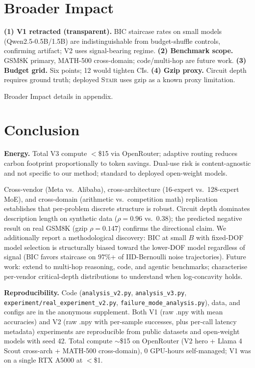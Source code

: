 \documentclass{article}
\newcommand{\method}{\textsc{Stair}}
\begin{document}
\section{Broader Impact}

\textbf{(1) V1 retracted (transparent).}  BIC staircase rates on small models (Qwen2.5-0.5B/1.5B) are indistinguishable from budget-shuffle controls, confirming artifact; V2 uses signal-bearing regime.  \textbf{(2) Benchmark scope.}  GSM8K primary, MATH-500 cross-domain; code/multi-hop are future work.  \textbf{(3) Budget grid.}  Six points; 12 would tighten CIs.  \textbf{(4) Gzip proxy.}  Circuit depth requires ground truth; deployed \method{} uses gzip as a known proxy limitation.

Broader Impact details in appendix.

\section{Conclusion}
\textbf{Energy.}  Total V3 compute $<$\$15 via OpenRouter; adaptive routing reduces carbon footprint proportionally to token savings.  Dual-use risk is content-agnostic and not specific to our method; standard to deployed open-weight models.

Cross-vendor (Meta vs.\ Alibaba), cross-architecture (16-expert vs.\ 128-expert MoE), and cross-domain (arithmetic vs.\ competition math) replication establishes that per-problem discrete structure is robust.  Circuit depth dominates description length on synthetic data ($\rho{=}0.96$ vs.\ $0.38$); the predicted negative result on real GSM8K (gzip $\rho{=}0.147$) confirms the directional claim.  We additionally report a methodological discovery: BIC at small $B$ with fixed-DOF model selection is structurally biased toward the lower-DOF model regardless of signal (BIC favors staircase on $97\%$+ of IID-Bernoulli noise trajectories).  Future work: extend to multi-hop reasoning, code, and agentic benchmarks; characterise per-vendor critical-depth distributions to understand when log-concavity holds.

\textbf{Reproducibility.}  Code (\texttt{analysis\_v2.py}, \texttt{analysis\_v3.py}, \texttt{experiment/real\_experiment\_v2.py}, \texttt{failure\_mode\_analysis.py}), data, and configs are in the anonymous supplement.  Both V1 (raw .npy with mean accuracies) and V2 (raw .npy with per-sample successes, plus per-call latency metadata) experiments are reproducible from public datasets and open-weight models with seed 42.  Total compute $\sim$\$15 on OpenRouter (V2 hero + Llama 4 Scout cross-arch + MATH-500 cross-domain), 0 GPU-hours self-managed; V1 was on a single RTX A5000 at $<$\$1.
\end{document}
